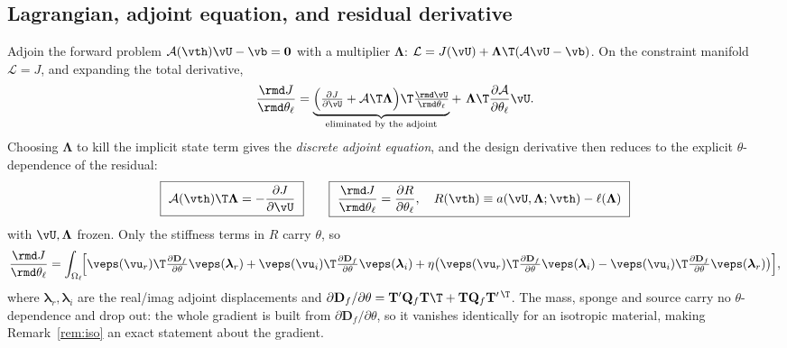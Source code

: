\documentclass[11pt]{article}
\begin{document}
\subsection{Lagrangian, adjoint equation, and residual derivative}
Adjoin the forward problem $\mathcal A(\vth)\vU-\vb=\mathbf0$ with a multiplier
$\bm\Lambda$: $\mathcal L=J(\vU)+\bm\Lambda\T(\mathcal A\vU-\vb)$. On the
constraint manifold $\mathcal L=J$, and expanding the total derivative,
\begin{equation}
  \frac{\rmd J}{\rmd\theta_\ell}
  =\underbrace{\Bigl(\tfrac{\partial J}{\partial\vU}
  +\mathcal A\T\bm\Lambda\Bigr)\T\tfrac{\rmd\vU}{\rmd\theta_\ell}}
  _{\text{eliminated by the adjoint}}
  +\ \bm\Lambda\T\frac{\partial\mathcal A}{\partial\theta_\ell}\vU .
\end{equation}
Choosing $\bm\Lambda$ to kill the implicit state term gives the \emph{discrete
adjoint equation}, and the design derivative then reduces to the explicit
$\theta$-dependence of the residual:
\begin{equation}
  \boxed{\ \mathcal A(\vth)\T\bm\Lambda=-\frac{\partial J}{\partial\vU}\ }
  \qquad
  \boxed{\ \frac{\rmd J}{\rmd\theta_\ell}=\frac{\partial R}{\partial\theta_\ell},
  \quad R(\vth)\equiv a(\vU,\bm\Lambda;\vth)-\ell(\bm\Lambda)\ }
  \label{eq:adj}
\end{equation}
with $\vU,\bm\Lambda$ frozen. Only the stiffness terms in $R$ carry $\theta$, so
\begin{equation}
  \frac{\rmd J}{\rmd\theta_\ell}
  =\int_{\Omega_\ell}\!\Bigl[\veps(\vu_r)\T
  \tfrac{\partial\mathbf D_f}{\partial\theta}\veps(\bm\lambda_r)
  +\veps(\vu_i)\T\tfrac{\partial\mathbf D_f}{\partial\theta}\veps(\bm\lambda_i)
  +\eta\bigl(\veps(\vu_r)\T\tfrac{\partial\mathbf D_f}{\partial\theta}
  \veps(\bm\lambda_i)-\veps(\vu_i)\T\tfrac{\partial\mathbf D_f}{\partial\theta}
  \veps(\bm\lambda_r)\bigr)\Bigr],
  \label{eq:sens}
\end{equation}
where $\bm\lambda_r,\bm\lambda_i$ are the real/imag adjoint displacements and
$\partial\mathbf D_f/\partial\theta=\mathbf T'\mathbf Q_f\mathbf T\T+\mathbf T
\mathbf Q_f\mathbf T'^{\,\T}$. The mass, sponge and source carry no
$\theta$-dependence and drop out: the whole gradient is built from
$\partial\mathbf D_f/\partial\theta$, so it vanishes identically for an isotropic
material, making Remark~\ref{rem:iso} an exact statement about the gradient.
\end{document}
